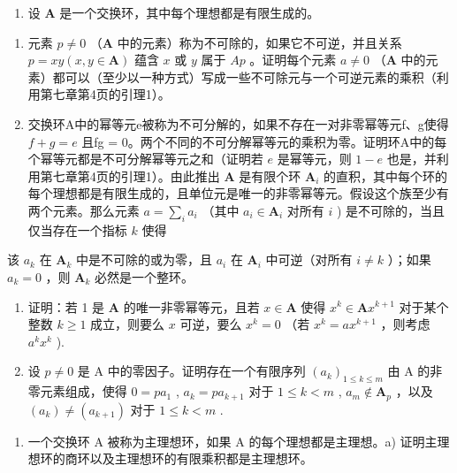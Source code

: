 \begin{enumerate}
\def\labelenumi{\arabic{enumi})}
\setcounter{enumi}{4}
\tightlist
\item
  设 \(\mathbf{A}\) 是一个交换环，其中每个理想都是有限生成的。
\end{enumerate}

\begin{enumerate}
\def\labelenumi{\alph{enumi})}
\item
  元素 \(p \neq 0\) （\(\mathbf{A}\) 中的元素）称为不可除的，如果它不可逆，并且关系 \(p = xy (x, y \in \mathbf{A})\) 蕴含 \(x\) 或 \(y\) 属于 \(A p\) 。证明每个元素 \(a \neq 0\) （\(\mathbf{A}\) 中的元素）都可以（至少以一种方式）写成一些不可除元与一个可逆元素的乘积（利用第七章第4页的引理1）。
\item
  交换环A中的幂等元e被称为不可分解的，如果不存在一对非零幂等元f、g使得 \(f + g = e\) 且fg = 0。两个不同的不可分解幂等元的乘积为零。证明环A中的每个幂等元都是不可分解幂等元之和（证明若 \(e\) 是幂等元，则 \(1 - e\) 也是，并利用第七章第4页的引理1）。由此推出 \(\mathbf{A}\) 是有限个环 \(\mathbf{A}_i\) 的直积，其中每个环的每个理想都是有限生成的，且单位元是唯一的非零幂等元。假设这个族至少有两个元素。那么元素 \(a = \sum_{i} a_i\) （其中 \(a_i \in \mathbf{A}_i\) 对所有 \(i\) ) 是不可除的，当且仅当存在一个指标 \(k\) 使得
\end{enumerate}

该 \(a_{k}\) 在 \(\mathbf{A}_{k}\) 中是不可除的或为零，且 \(a_{i}\) 在 \(\mathbf{A}_{i}\) 中可逆（对所有 \(i \neq k\) ）；如果 \(a_{k} = 0\) ，则 \(\mathbf{A}_{k}\) 必然是一个整环。

\begin{enumerate}
\def\labelenumi{\alph{enumi})}
\setcounter{enumi}{2}
\item
  证明：若 1 是 \(\mathbf{A}\) 的唯一非零幂等元，且若 \(x \in \mathbf{A}\) 使得 \(x^k \in \mathbf{A}x^{k+1}\) 对于某个整数 \(k \geqslant 1\) 成立，则要么 \(x\) 可逆，要么 \(x^k = 0\) （若 \(x^k = ax^{k+1}\) ，则考虑 \(a^k x^k\) ).
\item
  设 \(p \neq 0\) 是 A 中的零因子。证明存在一个有限序列 \((a_k)_{1 \leqslant k \leqslant m}\) 由 A 的非零元素组成，使得 \(0 = pa_1\) , \(a_k = pa_{k+1}\) 对于 \(1 \leqslant k < m\) , \(a_m \notin \mathbf{A}_p\) ，以及 \((a_k) \neq (a_{k+1})\) 对于 \(1 \leqslant k < m\) .
\end{enumerate}

\begin{enumerate}
\def\labelenumi{\arabic{enumi})}
\setcounter{enumi}{5}
\tightlist
\item
  一个交换环 A 被称为主理想环，如果 A 的每个理想都是主理想。a) 证明主理想环的商环以及主理想环的有限乘积都是主理想环。
\end{enumerate}

